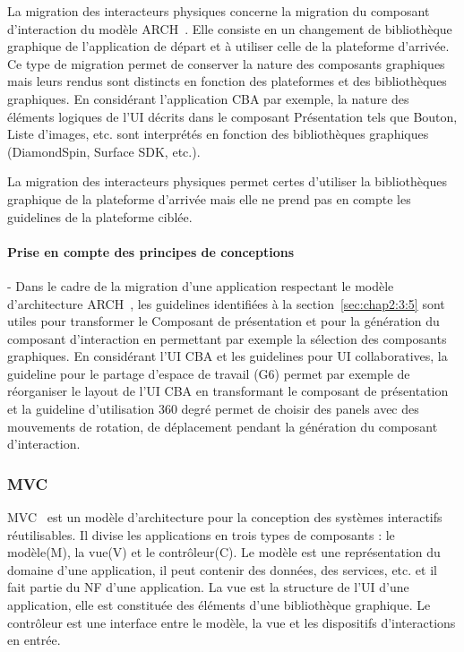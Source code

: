 La migration des interacteurs physiques concerne la migration du composant d'interaction du modèle ARCH~\cite{Thevenin2002}. Elle consiste en un changement de bibliothèque graphique de l'application de départ et à utiliser celle de la plateforme d'arrivée. Ce type de migration permet de conserver la nature des composants graphiques mais leurs rendus sont distincts en fonction des plateformes et des bibliothèques graphiques. En considérant l'application CBA par exemple, la nature des éléments logiques de l'UI décrits dans le composant Présentation tels que Bouton, Liste d'images, etc. sont interprétés en fonction des bibliothèques graphiques (DiamondSpin, Surface SDK, etc.).

La migration des interacteurs physiques permet certes d'utiliser la bibliothèques graphique de la plateforme d'arrivée mais elle ne prend pas en compte les guidelines de la plateforme ciblée.\\

\paragraph{Prise en compte des principes de conceptions}- 
Dans le cadre de la migration d'une application respectant le modèle d'architecture ARCH~\cite{Pfaff1985}, les guidelines identifiées à la section~\ref{sec:chap2:3:5} sont utiles pour transformer le Composant de présentation et pour la génération du composant d'interaction en permettant par exemple la sélection des composants graphiques. En considérant l'UI CBA et les guidelines pour UI collaboratives, la guideline pour le partage d'espace de travail (G6) permet par exemple de réorganiser le layout de l'UI CBA en transformant le composant de présentation et la guideline d'utilisation 360 degré permet de choisir des panels avec des mouvements de rotation, de déplacement pendant la génération du composant d'interaction. 


\subsubsection{MVC}
MVC~\cite{Krasner1988} est un modèle d'architecture pour la conception des systèmes interactifs réutilisables. Il divise les applications en trois types de composants : le modèle(M), la vue(V) et le contrôleur(C). Le modèle est une représentation du domaine d'une application, il peut contenir des données, des services, etc. et il fait partie du NF d'une application. La vue est la structure de l'UI d'une application, elle est constituée des éléments d'une bibliothèque graphique. Le contrôleur est une interface entre le modèle, la vue et les dispositifs d'interactions en entrée.

